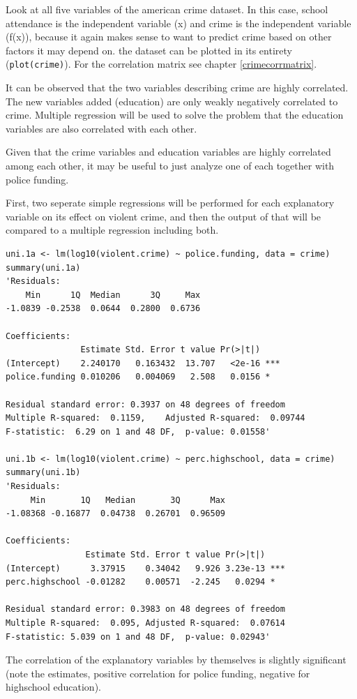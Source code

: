 \documentclass{article}
\begin{document}
Look at all five variables of the american crime dataset. In this case, school attendance is the independent variable (x) and crime is the independent variable (f(x)), because it again makes sense to want to predict crime based on other factors it may depend on. the dataset can be plotted in its entirety (\texttt{plot(crime)}). For the correlation matrix see chapter \ref{crimecorrmatrix}.\par 
It can be observed that the two variables describing crime are highly correlated. The new variables added (education) are only weakly negatively correlated to crime. Multiple regression will be used to solve the problem that the education variables are also correlated with each other.\par
Given that the crime variables and education variables are highly correlated among each other, it may be useful to just analyze one of each together with police funding.

First, two seperate simple regressions will be performed for each explanatory variable on its effect on violent crime, and then the output of that will be compared to a multiple regression including both.

\begin{lstlisting}
uni.1a <- lm(log10(violent.crime) ~ police.funding, data = crime)
summary(uni.1a)
'Residuals:
    Min      1Q  Median      3Q     Max 
-1.0839 -0.2538  0.0644  0.2800  0.6736 

Coefficients:
               Estimate Std. Error t value Pr(>|t|)    
(Intercept)    2.240170   0.163432  13.707   <2e-16 ***
police.funding 0.010206   0.004069   2.508   0.0156 *  

Residual standard error: 0.3937 on 48 degrees of freedom
Multiple R-squared:  0.1159,	Adjusted R-squared:  0.09744 
F-statistic:  6.29 on 1 and 48 DF,  p-value: 0.01558'

uni.1b <- lm(log10(violent.crime) ~ perc.highschool, data = crime)
summary(uni.1b)
'Residuals:
     Min       1Q   Median       3Q      Max 
-1.08368 -0.16877  0.04738  0.26701  0.96509 

Coefficients:
                Estimate Std. Error t value Pr(>|t|)    
(Intercept)      3.37915    0.34042   9.926 3.23e-13 ***
perc.highschool -0.01282    0.00571  -2.245   0.0294 *  

Residual standard error: 0.3983 on 48 degrees of freedom
Multiple R-squared:  0.095,	Adjusted R-squared:  0.07614 
F-statistic: 5.039 on 1 and 48 DF,  p-value: 0.02943'
\end{lstlisting}
The correlation of the explanatory variables by themselves is slightly significant (note the estimates, positive correlation for police funding, negative for highschool education).
\end{document}
